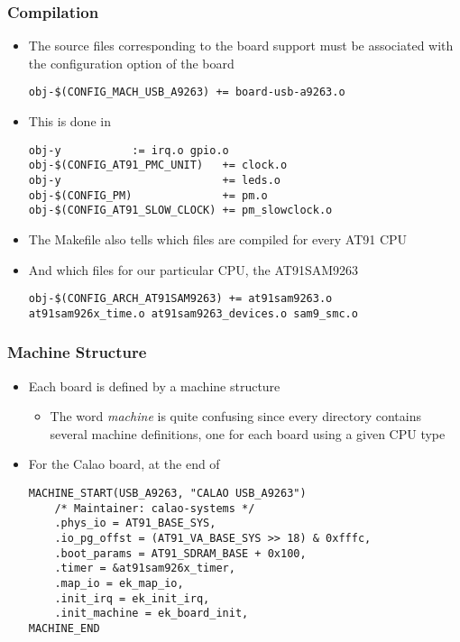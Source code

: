 \begin{frame}[fragile]
  \frametitle{Compilation}
  \begin{itemize}
  \item The source files corresponding to the board support must be
    associated with the configuration option of the board
\begin{verbatim}
obj-$(CONFIG_MACH_USB_A9263) += board-usb-a9263.o
\end{verbatim}
  \item This is done in 
\begin{verbatim}
obj-y           := irq.o gpio.o
obj-$(CONFIG_AT91_PMC_UNIT)   += clock.o
obj-y                         += leds.o
obj-$(CONFIG_PM)              += pm.o
obj-$(CONFIG_AT91_SLOW_CLOCK) += pm_slowclock.o
\end{verbatim}
  \item The Makefile also tells which files are compiled for every AT91 CPU
  \item And which files for our particular CPU, the AT91SAM9263
{\footnotesize
\begin{verbatim}
obj-$(CONFIG_ARCH_AT91SAM9263) += at91sam9263.o
at91sam926x_time.o at91sam9263_devices.o sam9_smc.o
\end{verbatim}
}
\end{itemize}
\end{frame}

\begin{frame}[fragile]
  \frametitle{Machine Structure}
  \begin{itemize}
  \item Each board is defined by a machine structure
    \begin{itemize}
    \item The word \emph{machine} is quite confusing since every
       directory contains several machine definitions, one for
      each board using a given CPU type
    \end{itemize}
  \item For the Calao board, at the end of
\begin{verbatim}
MACHINE_START(USB_A9263, "CALAO USB_A9263")
    /* Maintainer: calao-systems */
    .phys_io = AT91_BASE_SYS,
    .io_pg_offst = (AT91_VA_BASE_SYS >> 18) & 0xfffc,
    .boot_params = AT91_SDRAM_BASE + 0x100,
    .timer = &at91sam926x_timer,
    .map_io = ek_map_io,
    .init_irq = ek_init_irq,
    .init_machine = ek_board_init,
MACHINE_END
\end{verbatim}
\end{itemize}
\end{frame}

